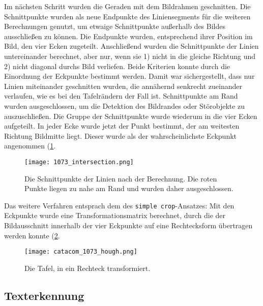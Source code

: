 Im nächsten Schritt wurden die Geraden mit dem Bildrahmen geschnitten. Die Schnittpunkte wurden als neue Endpunkte des Liniensegments für die weiteren Berechnungen genutzt, um etwaige Schnittpunkte außerhalb des Bildes ausschließen zu können. Die Endpunkte wurden, entsprechend ihrer Position im Bild, den vier Ecken zugeteilt. Anschließend wurden die Schnittpunkte der Linien untereinander berechnet, aber nur, wenn sie 1) nicht in die gleiche Richtung und 2) nicht diagonal durchs Bild verliefen. Beide Kriterien konnte durch die Einordnung der Eckpunkte bestimmt werden. Damit war sichergestellt, dass nur Linien miteinander geschnitten wurden, die annähernd senkrecht zueinander verlaufen, wie es bei den Tafelrändern der Fall ist. Schnittpunkte am Rand wurden ausgeschlossen, um die Detektion des Bildrandes oder Störobjekte zu auszuschließen.
Die Gruppe der Schnittpunkte wurde wiederum in die vier Ecken aufgeteilt. In jeder Ecke wurde jetzt der Punkt bestimmt, der am weitesten Richtung Bildmitte liegt. Dieser wurde als der wahrscheinlichste Eckpunkt angenommen (\ref{fig:intersection}.
\begin{figure}[h!]
\centering
\texttt{[image: 1073\_intersection.png]}
\caption{Die Schnittpunkte der Linien nach der Berechnung. Die roten Punkte liegen zu nahe am Rand und wurden daher ausgeschlossen.}
\label{fig:intersection}
\end{figure}
Das weitere Verfahren entsprach dem des \verb|simple crop|-Ansatzes: Mit den Eckpunkte wurde eine Transformationsmatrix berechnet, durch die der Bildausschnitt innerhalb der vier Eckpunkte auf eine Rechtecksform übertragen werden konnte (\ref{fig:houghcrop}.
\begin{figure}[h!]
\centering
\texttt{[image: catacom\_1073\_hough.png]}
\caption{Die Tafel, in ein Rechteck transformiert.}
\label{fig:houghcrop}
\end{figure}

\subsection{Texterkennung}

